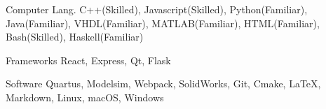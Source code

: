 

\begin{cvskills}

  \cvskill
    {Computer Lang.} %
    {C++(Skilled), Javascript(Skilled), Python(Familiar), Java(Familiar), VHDL(Familiar), MATLAB(Familiar), HTML(Familiar), Bash(Skilled), Haskell(Familiar)} %

  \cvskill
    {Frameworks\phantom{aaa}} %
    {React, Express, Qt, Flask} %

  \cvskill
    {Software\phantom{aaaaaa}} %
    {Quartus, Modelsim, Webpack, SolidWorks, Git, Cmake, LaTeX, Markdown, Linux, macOS, Windows} %


\end{cvskills}
